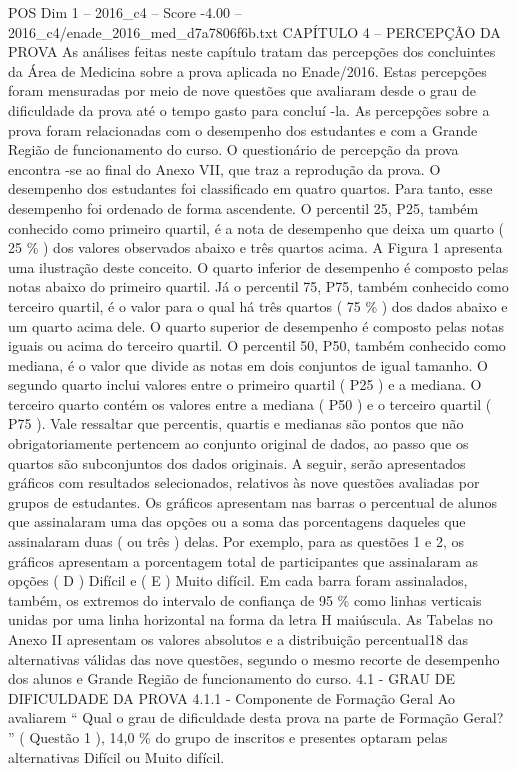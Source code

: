 \begin{textsample}{POS Dim 1 – 2016\_c4 – Score -4.00 – 2016\_c4/enade\_2016\_med\_d7a7806f6b.txt}  \label{ex:f1_pos_290}
CAPÍTULO 4 – PERCEPÇÃO DA PROVA As análises feitas neste capítulo tratam das percepções dos concluintes da Área de Medicina sobre a prova aplicada no Enade/2016.
Estas percepções foram mensuradas por meio de nove questões que avaliaram desde o grau de dificuldade da prova até o tempo gasto para concluí -la.
As percepções sobre a prova foram relacionadas com o desempenho dos estudantes e com a Grande Região de funcionamento do curso.
O questionário de percepção da prova encontra -se ao final do Anexo VII, que traz a reprodução da prova.
O desempenho dos estudantes foi classificado em quatro quartos.
Para tanto, esse desempenho foi ordenado de forma ascendente.
O percentil 25, P25, também conhecido como primeiro quartil, é a nota de desempenho que deixa um quarto ( 25 \% ) dos valores observados abaixo e três quartos acima.
A Figura 1 apresenta uma ilustração deste conceito.
O quarto inferior de desempenho é composto pelas notas abaixo do primeiro quartil.
Já o percentil 75, P75, também conhecido como terceiro quartil, é o valor para o qual há três quartos ( 75 \% ) dos dados abaixo e um quarto acima dele.
O quarto superior de desempenho é composto pelas notas iguais ou acima do terceiro quartil.
O percentil 50, P50, também conhecido como mediana, é o valor que divide as notas em dois conjuntos de igual tamanho.
O segundo quarto inclui valores entre o primeiro quartil ( P25 ) e a mediana.
O terceiro quarto contém os valores entre a mediana ( P50 ) e o terceiro quartil ( P75 ).
Vale ressaltar que percentis, quartis e medianas são pontos que não obrigatoriamente pertencem ao conjunto original de dados, ao passo que os quartos são subconjuntos dos dados originais.
A seguir, serão apresentados gráficos com resultados selecionados, relativos às nove questões avaliadas por grupos de estudantes.
Os gráficos apresentam nas barras o percentual de alunos que assinalaram uma das opções ou a soma das porcentagens daqueles que assinalaram duas ( ou três ) delas.
Por exemplo, para as questões 1 e 2, os gráficos apresentam a porcentagem total de participantes que assinalaram as opções ( D ) Difícil e ( E ) Muito difícil.
Em cada barra foram assinalados, também, os extremos do intervalo de confiança de 95 \% como linhas verticais unidas por uma linha horizontal na forma da letra H maiúscula.
As Tabelas no Anexo II apresentam os valores absolutos e a distribuição percentual18 das alternativas válidas das nove questões, segundo o mesmo recorte de desempenho dos alunos e Grande Região de funcionamento do curso. 4.1 - GRAU DE DIFICULDADE DA PROVA 4.1.1 - Componente de Formação Geral Ao avaliarem “ Qual o grau de dificuldade desta prova na parte de Formação Geral? ” ( Questão 1 ), 14,0 \% do grupo de inscritos e presentes optaram pelas alternativas Difícil ou Muito difícil.

\end{textsample}
